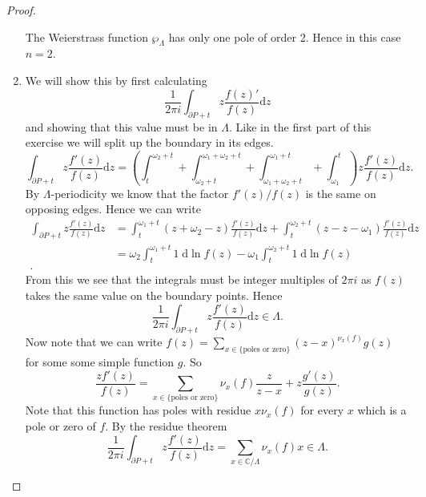 \documentclass[a4paper]{article}
\theoremstyle{theoremdd}
\theoremstyle{definitiondd}
\theoremstyle{remarkdd}
\newcommand{\C}{\mathbb{C}}
\begin{document}
\begin{proof}
\begin{enumerate}
The Weierstrass function $\wp_{\Lambda}$ has only one pole of order 2. Hence in this case  $n = 2$.
\item 
	We will show this by first calculating \[
		\frac{1}{2\pi i}\int_{\partial P + t} z \frac{f(z)'}{f(z)} \mathrm d z
	\]
	and showing that this value must be in $\Lambda$.
	Like in the first part of this exercise we will split up the boundary in its edges.
	\[	
		\int_{\partial P+ t} z \frac{f'(z)}{f(z)} \mathrm d z = \left(\int_t^{\omega_2 + t} + \int_{\omega_2+t}^{\omega_1 + \omega_2 + t} + \int_{\omega_1 + \omega_2 + t} ^{\omega_1 + t} + \int_{\omega_1}^{t}\right) z \frac{f'(z)}{f(z)} \mathrm dz
	.\]
	By $\Lambda$-periodicity we know that the factor $f'(z) / f(z)$ is the same on opposing edges. Hence we can write \begin{align*}
		\int_{\partial P + t} z \frac{f'(z)}{f(z)} \mathrm d z &= \int_t^{\omega_1 + t} (z + \omega_2 - z) \frac{f'(z)}{f(z)} \mathrm d z + \int_{t}^{\omega_2 + t} (z - z - \omega_1) \frac{f'(z)}{f(z)} \mathrm d z\\
								       &= \omega_2 \int_t^{\omega_1 + t} 1 \; \mathrm d \ln f(z) - \omega_1 \int_t^{\omega_2 +t} 1 \; \mathrm d \ln f(z) \\
	.\end{align*} 
	From this we see that the integrals must be integer multiples of  $2\pi i$ as $f(z)$ takes the same value on the boundary points. 
	Hence 
	\[
		\frac{1}{2\pi i } \int_{\partial P + t} z \frac{f'(z)}{f(z)} \mathrm d z \in \Lambda
	.\] 
	Now note that we can write $f(z) = \sum_{x \in \{\text{poles or zero}\} }(z - x)^{\nu_x(f)}g(z)$ for some some simple function $g$. 
	So \[
		\frac{zf'(z)}{f(z)} = \sum_{x \in \{\text{poles or zero}\} }\nu_x(f) \frac{z}{ z - x} + z \frac{g'(z)}{g(z)}
	.\] 
	Note that this function has poles with residue $x \nu_x(f)$ for every $x$ which is a pole or zero of  $f$. By the residue theorem  \[
		\frac{1}{2\pi i} \int_{\partial P + t} z \frac{f'(z)}{f(z)} \mathrm d z = \sum_{x \in \C / \Lambda} \nu_x(f)  x \in \Lambda 
	.\]  
\end{enumerate}
\end{proof}
\printbibliography
\end{document}
